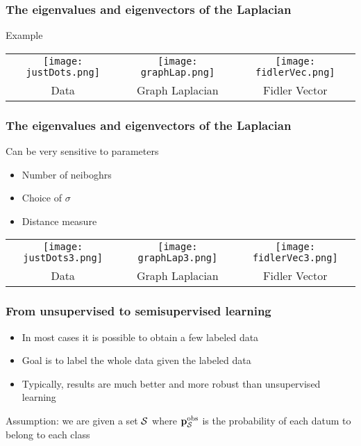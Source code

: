 \documentclass[12pt,fleqn]{beamer}
\begin{document}
\begin{frame}
\frametitle{The eigenvalues and eigenvectors of the Laplacian }

Example
\begin{center}
\begin{tabular}{ccc}
\texttt{[image: justDots.png]} &
\texttt{[image: graphLap.png]} &
\texttt{[image: fidlerVec.png]} \\
Data & Graph Laplacian & Fidler Vector 
\end{tabular}
\end{center}

\end{frame}

\begin{frame}
\frametitle{The eigenvalues and eigenvectors of the Laplacian }

Can be very sensitive to parameters
\begin{itemize}
\item Number of neiboghrs
\item Choice of $\sigma$
\item Distance measure
\end{itemize}

\begin{center}
\begin{tabular}{ccc}
\texttt{[image: justDots3.png]} &
\texttt{[image: graphLap3.png]} &
\texttt{[image: fidlerVec3.png]} \\
Data & Graph Laplacian & Fidler Vector 
\end{tabular}
\end{center}


\end{frame}

\begin{frame}
\frametitle{From unsupervised to semisupervised learning }

\begin{itemize}
\item
In most cases it is possible to obtain a few labeled data
\item 
Goal is to label the whole data given the labeled data
\item
Typically, results are much better and more robust than unsupervised learning
\end{itemize}

\bigskip

Assumption: we are given a set ${\cal S}$ where ${\bf p}_{{\cal S}}^{\rm obs}$ is the probability of each datum to belong to each class 


\end{frame}
\end{document}
